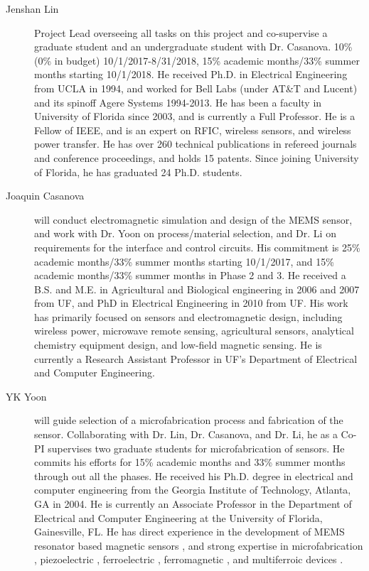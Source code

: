 \begin{description}
  \item[Jenshan Lin] Project Lead overseeing all tasks on this project and co-supervise a graduate student and an undergraduate student with Dr. Casanova. 10\% (0\% in budget) 10/1/2017-8/31/2018, 15\% academic months/33\% summer months starting 10/1/2018. He received Ph.D. in Electrical Engineering from UCLA in 1994, and worked for Bell Labs (under AT\&T and Lucent) and its spinoff Agere Systems 1994-2013. He has been a faculty in University of Florida since 2003, and is currently a Full Professor. He is a Fellow of IEEE, and is an expert on RFIC, wireless sensors, and wireless power transfer. He has over 260 technical publications in refereed journals and conference proceedings, and holds 15 patents. Since joining University of Florida, he has graduated 24 Ph.D. students.
  \item[Joaquin Casanova] will conduct electromagnetic simulation and design of the MEMS sensor, and work with Dr. Yoon on process/material selection, and Dr. Li on requirements for the interface and control circuits. His commitment is 25\% academic months/33\% summer months starting 10/1/2017, and 15\% academic months/33\% summer months in Phase 2 and 3. He received a B.S. and M.E. in Agricultural and Biological engineering in 2006 and 2007 from UF, and PhD in Electrical Engineering in 2010 from UF. His work has primarily focused on sensors and electromagnetic design, including wireless power, microwave remote sensing, agricultural sensors, analytical chemistry equipment design, and low-field magnetic sensing. He is currently a Research Assistant Professor in UF's Department of Electrical and Computer Engineering. 
  \item[YK Yoon] will guide selection of a microfabrication process and fabrication of the sensor. Collaborating with Dr. Lin, Dr. Casanova, and Dr. Li, he as a Co-PI supervises two graduate students for microfabrication of sensors. He commits his efforts for 15\% academic months and 33\% summer months through out all the phases. He received his Ph.D. degree in electrical and computer engineering from the Georgia Institute of Technology, Atlanta, GA in 2004. He is currently an Associate Professor in the Department of Electrical and Computer Engineering at the University of Florida, Gainesville, FL. He has direct experience in the development of MEMS resonator based magnetic sensors \cite{choi2006magnetically, choi2006magnetically2, choi2011nonlinear}, and strong expertise in microfabrication \cite{yoon2006multidirectional}, piezoelectric \cite{wulateral}, ferroelectric \cite{kim2014microwave,yoon2005low,yoon2003reduced}, ferromagnetic \cite{rahimi2016study,rahimi2015cylindrical,yoon2013multi}, and multiferroic devices \cite{yoon2013multi,kim2014room}.


\end{description}
